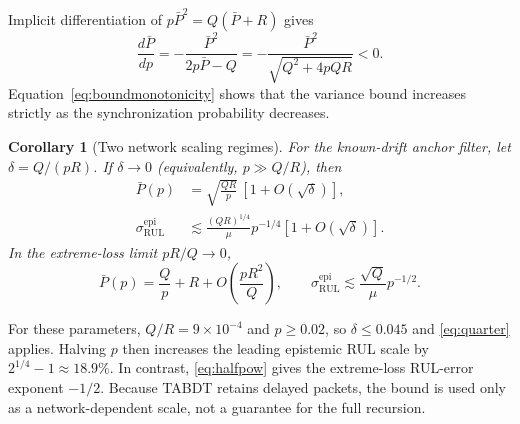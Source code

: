 \documentclass[journal]{IEEEtran}
\newtheorem{corollary}{Corollary}
\newcommand{\rul}{\mathrm{RUL}}
\newcommand{\Pb}{\bar{P}}
\begin{document}
Implicit differentiation of $p\Pb^2=Q(\Pb+R)$ gives
\begin{equation}\label{eq:boundmonotonicity}
\frac{d\Pb}{dp}=-\frac{\Pb^2}{2p\Pb-Q}
=-\frac{\Pb^2}{\sqrt{Q^2+4pQR}}<0.
\end{equation}
Equation~\eqref{eq:boundmonotonicity} shows that the variance bound increases
strictly as the synchronization probability decreases.

\begin{corollary}[Two network scaling regimes]\label{cor:regimes}
For the known-drift anchor filter, let $\delta=Q/(pR)$. If
$\delta\to0$ (equivalently, $p\gg Q/R$), then
\begin{equation}\label{eq:quarter}
\begin{aligned}
\Pb(p)&=\sqrt{\frac{QR}{p}}\,[1+O(\!\sqrt\delta)],\\
\sigma_{\rul}^{\mathrm{epi}}&\lesssim
\frac{(QR)^{1/4}}{\mu}p^{-1/4}[1+O(\!\sqrt\delta)].
\end{aligned}
\end{equation}
In the extreme-loss limit $pR/Q\to0$,
\begin{equation}\label{eq:halfpow}
\Pb(p)=\frac{Q}{p}+R+O\!\left(\frac{pR^2}{Q}\right),\qquad
\sigma_{\rul}^{\mathrm{epi}}\lesssim\frac{\sqrt Q}{\mu}p^{-1/2}.
\end{equation}
\end{corollary}

For these parameters, $Q/R=9\times10^{-4}$ and $p\geq0.02$, so
$\delta\leq0.045$ and \eqref{eq:quarter} applies. Halving $p$ then increases
the leading epistemic RUL scale by $2^{1/4}-1\approx18.9\%$. In contrast,
\eqref{eq:halfpow} gives the extreme-loss RUL-error exponent $-1/2$. Because
TABDT retains delayed packets, the bound is used only as a network-dependent
scale, not a guarantee for the full recursion.
\end{document}
